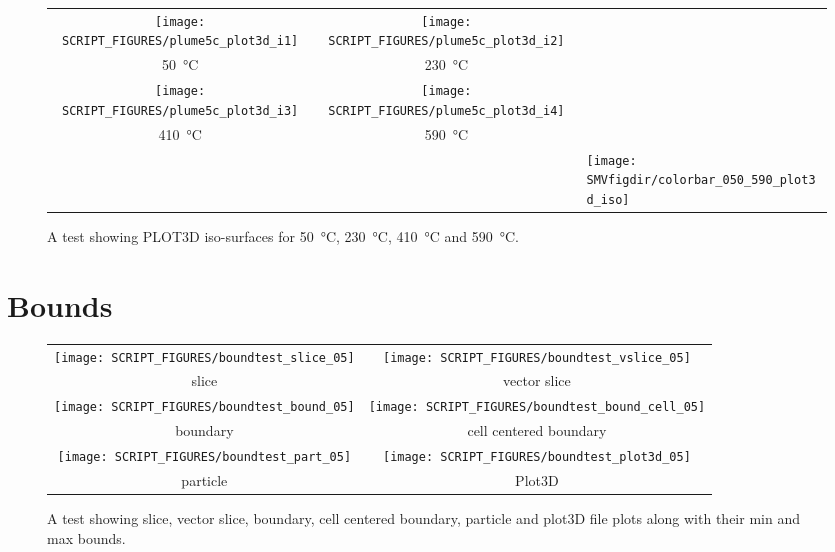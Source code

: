 \documentclass[11pt,twoside]{book}
\begin{document}
\begin{figure}[bph]
\begin{center}
\begin{tabular}{ccl}
 \texttt{[image: SCRIPT\_FIGURES/plume5c\_plot3d\_i1]}&
 \texttt{[image: SCRIPT\_FIGURES/plume5c\_plot3d\_i2]}\\
 \SI{50}{\degreeCelsius}&\SI{230}{\degreeCelsius}\\
  \texttt{[image: SCRIPT\_FIGURES/plume5c\_plot3d\_i3]}&
 \texttt{[image: SCRIPT\_FIGURES/plume5c\_plot3d\_i4]}\\
 \SI{410}{\degreeCelsius}&\SI{590}{\degreeCelsius}\\
&&\raisebox{0.5in}[0pt]{\texttt{[image: \\SMVfigdir/colorbar\_050\_590\_plot3d\_iso]}}\\
 \end{tabular}
\end{center}
 \caption{A test showing PLOT3D iso-surfaces for \SI{50}{\degreeCelsius},
 \SI{230}{\degreeCelsius}, \SI{410}{\degreeCelsius} and \SI{590}{\degreeCelsius}.}
\label{figPLOT3Dtestiso}%
\end{figure}

\clearpage

\section{Bounds}

\begin{figure}[bph]
\begin{center}
\begin{tabular}{cc}
 \texttt{[image: SCRIPT\_FIGURES/boundtest\_slice\_05]}&
 \texttt{[image: SCRIPT\_FIGURES/boundtest\_vslice\_05]}\\
 slice&vector slice\\
 \texttt{[image: SCRIPT\_FIGURES/boundtest\_bound\_05]}&
 \texttt{[image: SCRIPT\_FIGURES/boundtest\_bound\_cell\_05]}\\
 boundary&cell centered boundary\\
 \texttt{[image: SCRIPT\_FIGURES/boundtest\_part\_05]}&
 \texttt{[image: SCRIPT\_FIGURES/boundtest\_plot3d\_05]}\\
 particle&Plot3D
 \end{tabular}
\end{center}
 \caption[A test showing bounds for various file type]{A test showing slice, vector slice, boundary, cell centered boundary, particle and plot3D file plots along with their min and max bounds.}
\label{figBOUNDS}%
\end{figure}
\end{document}
